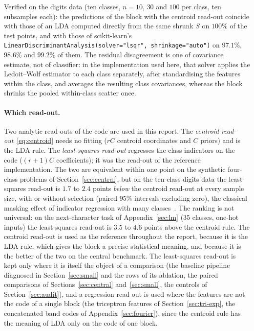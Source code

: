 \documentclass[11pt,a4paper]{article}
\theoremstyle{plain}
\theoremstyle{definition}
\theoremstyle{remark}
\begin{document}
Verified on the digits data (ten classes, $n=10$, $30$ and $100$ per class,
ten subsamples each): the predictions of the block with the centroid
read-out coincide with those of an LDA computed directly from the same
shrunk $S$ on $100\%$ of the test points, and with those of scikit-learn's
\texttt{LinearDiscriminantAnalysis(solver="lsqr", shrinkage="auto")} on
$97.1\%$, $98.6\%$ and $99.2\%$ of them. The residual disagreement is one of
covariance estimate, not of classifier: in the implementation used here,
that solver applies the Ledoit--Wolf estimator to each class separately,
after standardising the features within the class, and averages the
resulting class covariances, whereas the block shrinks the pooled
within-class scatter once.

\paragraph{Which read-out.} Two analytic read-outs of the code are used in
this report. The \emph{centroid read-out}~\eqref{eq:centroid} needs no
fitting ($rC$ centroid coordinates and $C$ priors) and is the LDA rule. The
\emph{least-squares read-out} regresses the class indicators on the code
($(r+1)C$ coefficients); it was the read-out of the reference
implementation. The
two are equivalent within one point on the synthetic four-class problems of
Section~\ref{sec:central}, but on the ten-class digits data the
least-squares read-out is $1.7$ to $2.4$ points \emph{below} the centroid
read-out at every sample size, with or without selection (paired $95\%$
intervals excluding zero), the classical masking effect of indicator
regression with many classes~\cite[Section~4.2]{hastie2009}. The ranking is
not universal: on the next-character task of Appendix~\ref{sec:lm}
($35$ classes, one-hot inputs) the least-squares read-out is $3.5$ to $4.6$
points above the centroid rule. The centroid read-out is used as the
reference throughout the report, because it is the LDA rule, which gives
the block a precise statistical meaning, and because it is the better of
the two on the central benchmark. The least-squares read-out is kept only
where it is itself the object of a comparison (the baseline pipeline
diagnosed in Section~\ref{sec:small} and the rows of its ablation, the
paired comparisons of Sections~\ref{sec:central} and~\ref{sec:small}, the
controls of Section~\ref{sec:audit}), and a regression read-out is used
where the features are not the code of a single block (the triceptron
features of Section~\ref{sec:tri-exp}, the concatenated band codes of
Appendix~\ref{sec:fourier}), since the centroid rule has the meaning of
LDA only on the code of one block.
\end{document}
